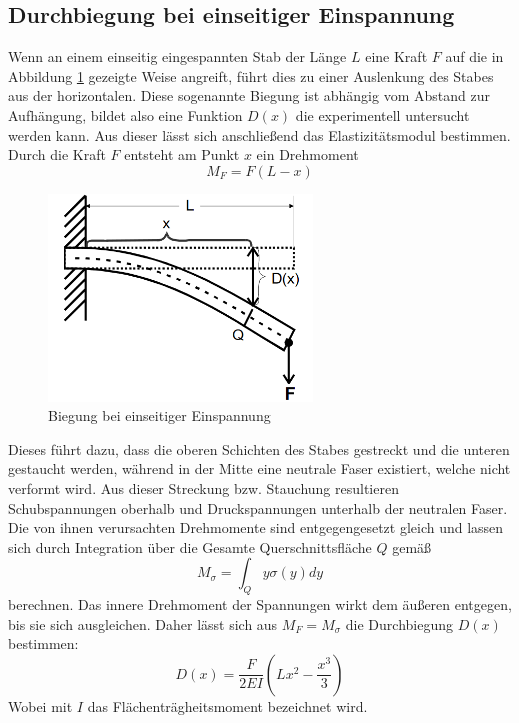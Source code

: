 \subsection{Durchbiegung bei einseitiger Einspannung}
Wenn an einem einseitig eingespannten Stab der Länge $L$ eine Kraft $F$ auf die in Abbildung \ref{fig:einseitig} gezeigte Weise angreift, führt dies zu einer Auslenkung des Stabes
aus der horizontalen. Diese sogenannte Biegung ist abhängig vom Abstand zur Aufhängung, bildet also eine Funktion $D(x)$ die experimentell untersucht werden kann. 
Aus dieser lässt sich anschließend das Elastizitätsmodul bestimmen. Durch die Kraft $F$ entsteht am Punkt $x$ ein Drehmoment 
\begin{equation*}
M_F=F(L-x)
\end{equation*}
\begin{figure}
\centering
\includegraphics[width=7cm, keepaspectratio]{Biegung einseitig}
\caption{Biegung bei einseitiger Einspannung}
\label{fig:einseitig}
\end{figure}
Dieses führt dazu, dass die oberen Schichten des Stabes gestreckt und die unteren gestaucht werden, während in der Mitte eine neutrale Faser existiert,
welche nicht verformt wird. Aus dieser Streckung bzw. Stauchung resultieren Schubspannungen oberhalb und Druckspannungen unterhalb der neutralen Faser.
Die von ihnen verursachten Drehmomente sind entgegengesetzt gleich und lassen sich durch Integration über die Gesamte Querschnittsfläche $Q$ gemäß
\begin{equation*}
M_{\sigma}=\int_{Q} y\sigma (y) dy
\end{equation*}
berechnen. Das innere Drehmoment der Spannungen wirkt dem äußeren entgegen, bis sie sich ausgleichen. Daher lässt sich aus $M_F=M_{\sigma}$ die Durchbiegung 
$D(x)$ bestimmen:
\begin{equation}
    \label{eq:eins}
D(x)=\frac{F}{2EI}(Lx^2-\frac{x^3}{3})
\end{equation}
Wobei mit $I$ das Flächenträgheitsmoment bezeichnet wird. \\
